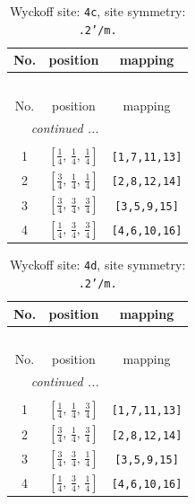 \documentclass[fleqn,8pt]{jsarticle}
\begin{document}
\renewcommand{\arraystretch}{1.2}
\begin{longtable}{ccc}
\caption{Wyckoff site: {\tt 4c}, site symmetry: {\tt .2'/m.}}
 \\
 \hline \hline
No. & position & mapping \\ \hline \endfirsthead

\multicolumn{2}{l}{\tablename\ \thetable{}} \\
 \hline \hline
No. & position & mapping \\ \hline \endhead

 \hline \hline
\multicolumn{2}{r}{\footnotesize\it continued ...} \\ \endfoot

 \hline \hline
\multicolumn{2}{r}{} \\ \endlastfoot

1 & $\left[ \frac{1}{4},\, \frac{1}{4},\, \frac{1}{4} \right]$ & {\tt [1,7,11,13]} \\ \hline
2 & $\left[ \frac{3}{4},\, \frac{1}{4},\, \frac{1}{4} \right]$ & {\tt [2,8,12,14]} \\ \hline
3 & $\left[ \frac{3}{4},\, \frac{3}{4},\, \frac{3}{4} \right]$ & {\tt [3,5,9,15]} \\ \hline
4 & $\left[ \frac{1}{4},\, \frac{3}{4},\, \frac{3}{4} \right]$ & {\tt [4,6,10,16]} \\
\end{longtable}
\renewcommand{\arraystretch}{1.2}
\begin{longtable}{ccc}
\caption{Wyckoff site: {\tt 4d}, site symmetry: {\tt .2'/m.}}
 \\
 \hline \hline
No. & position & mapping \\ \hline \endfirsthead

\multicolumn{2}{l}{\tablename\ \thetable{}} \\
 \hline \hline
No. & position & mapping \\ \hline \endhead

 \hline \hline
\multicolumn{2}{r}{\footnotesize\it continued ...} \\ \endfoot

 \hline \hline
\multicolumn{2}{r}{} \\ \endlastfoot

1 & $\left[ \frac{1}{4},\, \frac{1}{4},\, \frac{3}{4} \right]$ & {\tt [1,7,11,13]} \\ \hline
2 & $\left[ \frac{3}{4},\, \frac{1}{4},\, \frac{3}{4} \right]$ & {\tt [2,8,12,14]} \\ \hline
3 & $\left[ \frac{3}{4},\, \frac{3}{4},\, \frac{1}{4} \right]$ & {\tt [3,5,9,15]} \\ \hline
4 & $\left[ \frac{1}{4},\, \frac{3}{4},\, \frac{1}{4} \right]$ & {\tt [4,6,10,16]} \\
\end{longtable}
\end{document}
